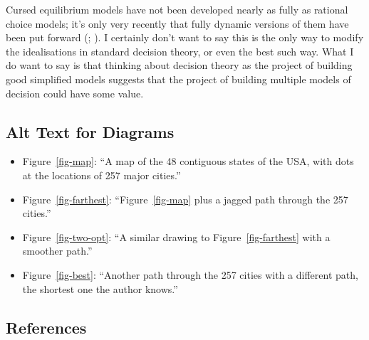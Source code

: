 \documentclass[
  12pt,
  letterpaper,
  DIV=11,
  numbers=noendperiod,
  twoside]{scrartcl}
\providecommand{\tightlist}{%
  \setlength{\itemsep}{0pt}\setlength{\parskip}{0pt}}
\begin{document}
Cursed equilibrium models have not been developed nearly as fully as
rational choice models; it's only very recently that fully dynamic
versions of them have been put forward (; ). I certainly don't want to say this is the only way to
modify the idealisations in standard decision theory, or even the best
such way. What I do want to say is that thinking about decision theory
as the project of building good simplified models suggests that the
project of building multiple models of decision could have some value.

\subsection*{Alt Text for Diagrams}\label{alt-text-for-diagrams}

\begin{itemize}
\tightlist
\item
  Figure~\ref{fig-map}: ``A map of the 48 contiguous states of the USA,
  with dots at the locations of 257 major cities.''
\item
  Figure~\ref{fig-farthest}: ``Figure~\ref{fig-map} plus a jagged path
  through the 257 cities.''
\item
  Figure~\ref{fig-two-opt}: ``A similar drawing to
  Figure~\ref{fig-farthest} with a smoother path.''
\item
  Figure~\ref{fig-best}: ``Another path through the 257 cities with a
  different path, the shortest one the author knows.''
\end{itemize}

\subsection*{References}\label{references}
\end{document}
